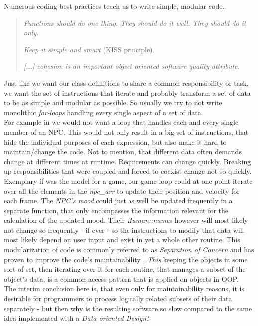 Numerous coding best practices teach us to write simple, modular code.
\begin{quote}
	\textit{Functions should do one thing. They should do it well. They should do it only.} 
	
	\textit{Keep it simple and smart} (KISS principle). 
	
	\textit{[...] cohesion is an important object-oriented
		software quality attribute.}
\end{quote}
Just like we want our class definitions to share a common responsibility or task, we want the set of instructions that iterate and probably transform a set of data to be as simple and modular as possible. So usually we try to not write monolithic \textit{for-loops} handling every single aspect of a set of data.\\ For example in  we would not want a loop that handles each and every single member of an NPC. This would not only result in a big set of instructions, that hide the individual purposes of each expression, but also make it hard to maintain/change the code. Not to mention, that different data often demands change at different times at runtime. Requirements can change quickly. Breaking up responsibilities that were coupled and forced to coexist change not so quickly.\\
Exemplary if  was the model for a game, our game loop could at one point iterate over all the elements in the \textit{npc\_arr} to update their position and velocity for each frame. The \textit{NPC's mood} could just as well be updated frequently in a separate function, that only encompasses the information relevant for the calculation of the updated mood.
Their \textit{Human::name}s however will most likely not change so frequently - if ever - so the instructions to modify that data will most likely depend on user input and exist in yet a whole other routine. This modularization of code is commonly referred to as \textit{Separation of Concern} and has proven to improve the code's maintainability .
\textit{This} keeping the objects in some sort of set, then iterating over it for each routine, that manages a subset of the object's data, is a common access pattern that is applied on objects in OOP.\\
The interim conclusion here is, that even only for maintainability reasons, it is desirable for programmers to process logically related subsets of their data separately - but then why is the resulting software so slow compared to the same idea implemented with a \textit{Data oriented Design}?\\
